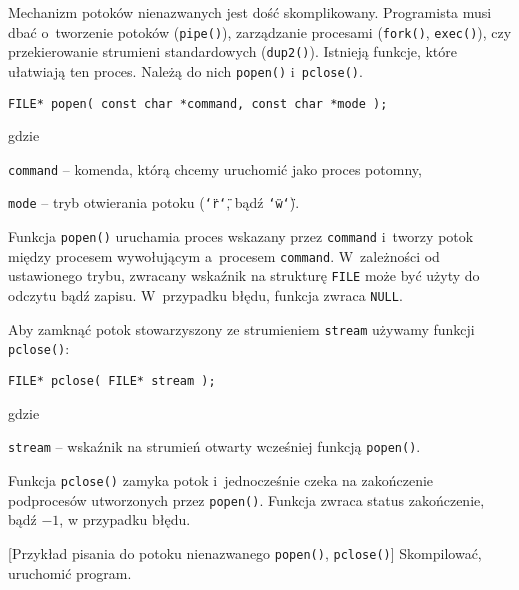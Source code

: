 Mechanizm potoków nienazwanych jest dość skomplikowany. Programista musi dbać
o~tworzenie potoków (\texttt{pipe()}), zarządzanie procesami (\texttt{fork()},
\texttt{exec()}), czy przekierowanie strumieni standardowych (\texttt{dup2()}).
Istnieją funkcje, które ułatwiają ten proces. Należą do nich \texttt{popen()}
i~\texttt{pclose()}.
\begin{lstlisting}[style=MyCStyle]
FILE* popen( const char *command, const char *mode );
\end{lstlisting}
gdzie
\begin{myitemize}
  \item \texttt{command} -- komenda, którą chcemy uruchomić jako proces potomny,
  \item \texttt{mode} -- tryb otwierania potoku (\texttt{\char`\"r\char`\"}, bądź \texttt{\char`\"w\char`\"}).
\end{myitemize}
Funkcja \texttt{popen()} uruchamia proces wskazany przez \texttt{command}
i~tworzy potok między procesem wywołującym a~procesem \texttt{command}.
W~zależności od ustawionego trybu, zwracany wskaźnik na strukturę \texttt{FILE}
może być użyty do odczytu bądź zapisu. W~przypadku błędu, funkcja zwraca
\texttt{NULL}.

Aby zamknąć potok stowarzyszony ze strumieniem \texttt{stream} używamy funkcji
\texttt{pclose()}:
\begin{lstlisting}[style=MyCStyle]
FILE* pclose( FILE* stream );
\end{lstlisting}
gdzie
\begin{myitemize}
  \item \texttt{stream} -- wskaźnik na strumień otwarty wcześniej funkcją \texttt{popen()}.
\end{myitemize}
Funkcja \texttt{pclose()} zamyka potok i~jednocześnie czeka na zakończenie
podprocesów utworzonych przez \texttt{popen()}. Funkcja zwraca status
zakończenie, bądź $-1$, w przypadku błędu.

\begin{example}{[Przykład pisania do potoku nienazwanego \texttt{popen()}, \texttt{pclose()}]}
  Skompilować, uruchomić program.
  
\end{example}

